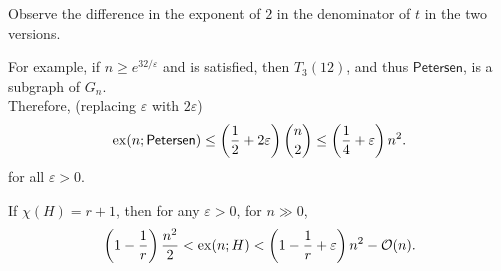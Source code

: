 			Observe the difference in the exponent of $2$ in the denominator of $t$ in the two versions.

			For example, if $n \ge e^{32/\varepsilon}$ and  is satisfied, then $T_{3}(12)$, and thus $\mathsf{Petersen}$, is a subgraph of $G_n$.\\
			Therefore, (replacing $\varepsilon$ with $2\varepsilon$)
			\[ \operatorname{ex}(n;\mathsf{Petersen}) \le \left(\frac{1}{2} + 2\varepsilon\right)\binom{n}{2} \le \left(\frac{1}{4} + \varepsilon\right)n^2. \]
			for all $\varepsilon > 0$.

			\begin{fcor}
				\label{theo: ESS exx square tight coloring}
				If $\chi(H) = r+1$, then for any $\varepsilon > 0$, for $n\gg 0$,
				\[ \left(1 - \frac{1}{r}\right)\frac{n^2}{2} < \operatorname{ex}(n;H) < \left(1 - \frac{1}{r} + \varepsilon\right)n^2 - \mathcal{O}(n). \]
			\end{fcor}


